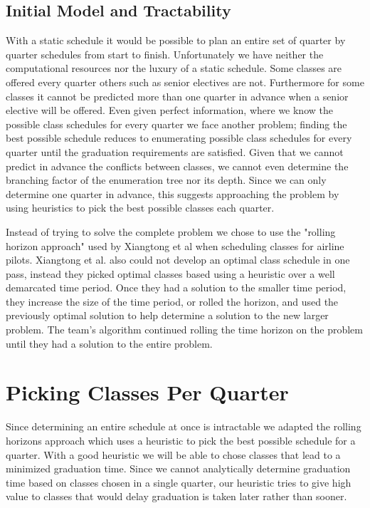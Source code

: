 \documentclass[11pt]{article} %
\begin{document}
\subsection{Initial Model and Tractability} With a static schedule it would be
possible to plan an entire set of quarter by quarter schedules from start to
finish. Unfortunately we have neither the computational resources nor the luxury
of a static schedule. Some classes are offered every quarter others such as
senior electives are not. Furthermore for some classes it cannot be predicted
more than one quarter in advance when a senior elective will be offered. Even
given perfect information, where we know the possible class schedules for every
quarter we face another problem; finding the best possible schedule reduces to
enumerating possible class schedules for every quarter until the graduation
requirements are satisfied.  Given that we cannot predict in advance the
conflicts between classes, we cannot even determine the branching factor of the
enumeration tree nor its depth. Since we can only determine one quarter in
advance, this suggests approaching the problem by using heuristics to pick the
best possible classes each quarter.

Instead of trying to solve the complete problem we chose to use the "rolling
horizon approach" used by Xiangtong et al \cite{xiangton:informs} when
scheduling classes for airline pilots. Xiangtong et al. also could not develop
an optimal class schedule in one pass, instead they picked optimal classes based
using a heuristic over a well demarcated time period. Once they had a solution
to the smaller time period, they increase the size of the time period, or rolled
the horizon, and used the previously optimal solution to help determine
a solution to the new larger problem. The team's algorithm continued rolling the
time horizon on the problem until they had a solution to the entire problem.

\section{Picking Classes Per Quarter} Since determining an entire schedule at
once is intractable we adapted the rolling horizons approach which uses
a heuristic to pick the best possible schedule for a quarter. With a good
heuristic we will be able to chose classes that lead to a minimized graduation
time. Since we cannot analytically determine graduation time based on classes
chosen in a single quarter, our heuristic tries to give high value to classes
that would delay graduation is taken later rather than sooner. 
\end{document}

